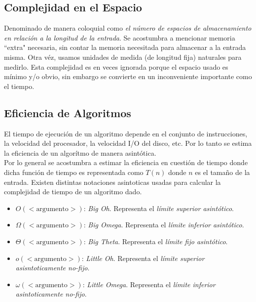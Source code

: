 \documentclass[letterpaper, 12pt]{article}
\begin{document}
\begin{justify}
        \subsection{Complejidad en el Espacio}
        Denominado de manera coloquial como \emph{el número de espacios de almacenamiento en relación a la longitud de la entrada}. Se acostumbra a mencionar memoria ``extra" necesaria, sin contar la memoria necesitada para almacenar a la entrada misma. Otra véz, usamos
        unidades de medida (de longitud fija) naturales para medirlo. Esta complejidad es en veces ignorada porque el espacio usado es mínimo y/o obvio, sin embargo se convierte en un inconveniente importante como el tiempo.  
        \subsection{Eficiencia de Algoritmos}
        El tiempo de ejecución de un algoritmo depende en el conjunto de instrucciones, la velocidad del procesador, la velocidad I/O del disco, etc. Por lo tanto se estima la eficiencia de un algorítmo de manera asintótica.
        \\ \newline Por lo general se acostumbra a estimar la eficiencia en cuestión de tiempo
        donde dicha función de tiempo es representada como \(T(n)\) donde \(n\) es el tamaño de la entrada. Existen distintas notaciones asintoticas usadas para calcular la complejidad de tiempo de un algoritmo dado.
        \begin{itemize}
            \item \(O(<\!\text{argumento}\!>)\): \emph{Big Oh}. Representa el \emph{límite superior asintótico}. 
            \item \(\Omega(<\!\text{argumento}>\!)\): \emph{Big Omega}. Representa el \emph{límite inferior asintótico}.
            \item \(\Theta(<\!\text{argumento}>\!)\): \emph{Big Theta}. Representa el \emph{límite fijo asintótico}.
            \item \(o(<\!\text{argumento}\!>)\): \emph{Little Oh}. Representa el \emph{límite superior asisntoticamente no-fijo}.
            \item \(\omega(<\!\text{argumento}\!>)\): \emph{Little Omega}. Representa el \emph{límite inferior asintoticamente no-fijo}.
        \end{itemize}

\end{justify}
\end{document}
